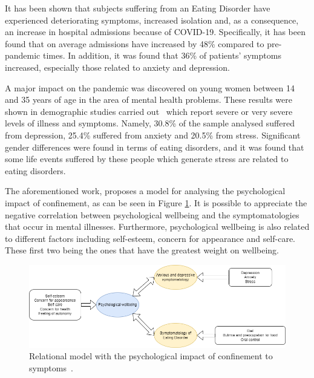 It has been shown that subjects suffering from an Eating Disorder have experienced deteriorating symptoms, increased isolation and, as a consequence, an increase in hospital admissions because of COVID-19. Specifically, it has been found that on average admissions have increased by 48\% compared to pre-pandemic times. In addition, it was found that 36\% of patients' symptoms increased, especially those related to anxiety and depression.

A major impact on the pandemic was discovered on young women between 14 and 35 years of age in the area of mental health problems. These results were shown in demographic studies carried out~\cite{vall2021impacto} which report severe or very severe levels of illness and symptoms. Namely, 30.8\% of the sample analysed suffered from depression, 25.4\% suffered from anxiety and 20.5\% from stress. Significant gender differences were found in terms of eating disorders, and it was found that some life events suffered by these people which generate stress are related to eating disorders.

The aforementioned work, proposes a model for analysing the psychological impact of confinement, as can be seen in Figure \ref{fig:vall_diagram}. It is possible to appreciate the negative correlation between psychological wellbeing and the symptomatologies that occur in mental illnesses. Furthermore, psychological wellbeing is also related to different factors including self-esteem, concern for appearance and self-care. These first two being the ones that have the greatest weight on wellbeing.

\begin{figure}[!htp]
    \centering
    \includegraphics[scale=0.53]{img/introduction/vall_diagram.png}
    \caption{Relational model with the psychological impact of confinement to symptoms~\cite{vall2021impacto}.}
    \label{fig:vall_diagram}
\end{figure}




